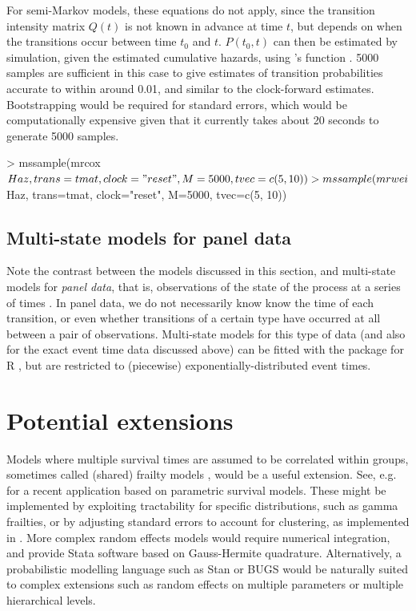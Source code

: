 \documentclass[nojss,nofooter]{jss}
\begin{document}
For semi-Markov models, these equations do not apply, since the
transition intensity matrix $Q(t)$ is not known in advance at time
$t$, but depends on when the transitions occur between time $t_0$ and
$t$.  $P(t_0, t)$ can then be estimated by simulation, given the
estimated cumulative hazards, using 's function
 \citep{fiocco:mstatepred}.  5000 samples are
sufficient in this case to give estimates of transition probabilities
accurate to within around 0.01, and similar to the clock-forward
estimates.  Bootstrapping would be required for standard errors, which
would be computationally expensive given that it currently takes about
20 seconds to generate 5000 samples.
\begin{Schunk}
\begin{Sinput}
> mssample(mrcox$Haz, trans=tmat, clock="reset", M=5000, tvec=c(5, 10))
> mssample(mrwei$Haz, trans=tmat, clock="reset", M=5000, tvec=c(5, 10))
\end{Sinput}
\end{Schunk}




\subsection{Multi-state models for panel data}

Note the contrast between the models discussed in this section, and
multi-state models for \emph{panel data}, that is, observations of the
state of the process at a series of times \citep{kalbfleisch:lawless}.
In panel data, we do not necessarily know know the time of each
transition, or even whether transitions of a certain type have
occurred at all between a pair of observations.  Multi-state models
for this type of data (and also for the exact event time data
discussed above) can be fitted with the  package for R
\citep{msmjss}, but are restricted to (piecewise)
exponentially-distributed event times.



\section{Potential extensions}
\label{sec:extensions}

Models where multiple survival times are assumed to be correlated
within groups, sometimes called (shared) frailty models
\citep{hougaard1995frailty}, would be a useful extension.  See,
e.g. \citet{crowther2014multilevel} for a recent application based on
parametric survival models.  These might be implemented by exploiting
tractability for specific distributions, such as gamma frailties, or
by adjusting standard errors to account for clustering, as implemented
in .  More complex random effects models would require
numerical integration, and \citep{crowther2014multilevel} provide
Stata software based on Gauss-Hermite quadrature. Alternatively, a
probabilistic modelling language such as Stan \citep{stan-manual:2014}
or BUGS \citep{bugs:book} would be naturally suited to complex
extensions such as random effects on multiple parameters or multiple
hierarchical levels.
\end{document}

